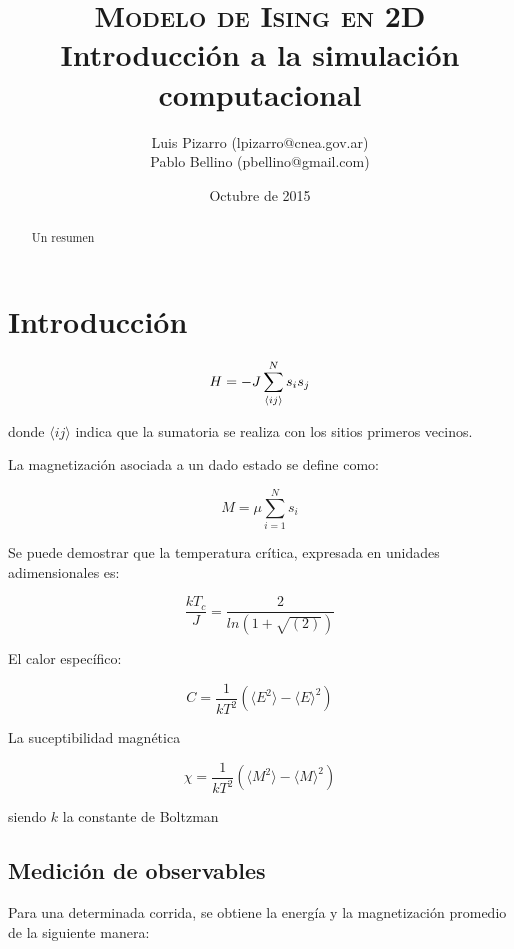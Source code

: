 \documentclass[a4paper,12pt]{article}
\title{\textsc{Modelo de Ising en 2D} \\ \vspace{2em} \Large{Introducción a la 
simulación computacional}}
\author{\small{Luis Pizarro (lpizarro@cnea.gov.ar)} \\
        \small{Pablo Bellino (pbellino@gmail.com)}}
\date{Octubre de 2015}
\begin{document}

\maketitle

\begin{abstract}
Un resumen
\end{abstract}


\section{Introducción}


\begin{equation}{\label{eq:hamiltoniano}}
H = - J \sum_{\langle ij \rangle}^N s_is_j
\end{equation}

\noindent donde $\langle ij \rangle$ indica que la sumatoria se realiza con los 
sitios primeros vecinos.

La magnetización asociada a un dado estado se define como:

\begin{equation}
M = \mu \sum_{i=1}^N s_i
\end{equation}

Se puede demostrar que la temperatura crítica, expresada en unidades 
adimensionales es:

\begin{equation}
\frac{k T_c }{J} = \frac{2}{ln(1+\sqrt{(2)})}
\end{equation}

El calor específico:

\begin{equation}
C  = \frac{1}{kT^2} \left(\langle E^2\rangle - \langle E \rangle^2\right)
\end{equation}

La suceptibilidad magnética

\begin{equation}
\chi = \frac{1}{kT^2} \left(\langle M^2\rangle - \langle M \rangle^2\right)
\end{equation}

\noindent siendo $k$ la constante de Boltzman

\subsection{Medición de observables}

Para una determinada corrida, se obtiene la energía y la magnetización promedio 
de la siguiente manera:
\end{document}

